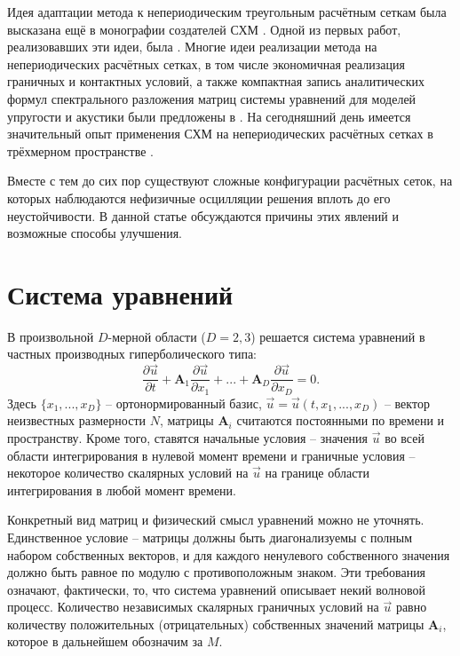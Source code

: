 \documentclass[a4paper]{article}
\numberwithin{equation}{section}
\begin{document}
Идея адаптации метода к непериодическим треугольным расчётным сеткам была 
высказана ещё в монографии создателей СХМ \cite{magomedov_kholodov_1988}. 
Одной из первых работ, реализовавших эти идеи, была \cite{chelnokov_agapov}. 
Многие идеи реализации метода на непериодических расчётных сетках, в том числе 
экономичная реализация граничных и контактных условий, а также 
компактная запись аналитических формул спектрального разложения 
матриц системы уравнений для моделей упругости и акустики были предложены в \cite{chelnokov}.
На сегодняшний день имеется значительный опыт применения СХМ 
на непериодических расчётных сетках в трёхмерном пространстве 
\cite{vassilevski_15, favorskaya_tetr}.

Вместе с тем до сих пор существуют сложные конфигурации расчётных сеток, на 
которых наблюдаются нефизичные осцилляции решения вплоть до его неустойчивости. 
В данной статье обсуждаются причины этих явлений и возможные способы улучшения. 


\section{Система уравнений}
В произвольной $D$-мерной области ($D = 2, 3$) решается система уравнений 
в частных производных гиперболического типа:
\begin{equation}
\label{general_equation}
	\frac{\partial\vec{u}}{\partial{t}}+
	\mathbf{A}_1\frac{\partial\vec{u}}{\partial{x_1}}+...+
	\mathbf{A}_D\frac{\partial\vec{u}}{\partial{x_D}}=0.
\end{equation}
Здесь $\{x_1, ..., x_D\}$ -- ортонормированный базис, 
$\vec{u} = \vec{u}(t, x_1, ..., x_D)$ -- вектор неизвестных размерности $N$,
матрицы $\mathbf{A}_i$ считаются постоянными по времени и пространству.
Кроме того, ставятся начальные условия -- значения $\vec{u}$ 
во всей области интегрирования в нулевой момент времени и
граничные условия -- некоторое количество скалярных условий на $\vec{u}$ 
на границе области интегрирования в любой момент времени.

Конкретный вид матриц и физический смысл уравнений можно не уточнять. 
Единственное условие -- матрицы должны быть диагонализуемы с полным набором 
собственных векторов, и для каждого ненулевого собственного значения должно быть
равное по модулю с противоположным знаком. Эти требования означают, фактически,
то, что система уравнений описывает некий волновой процесс. Количество
независимых скалярных граничных условий на $\vec{u}$ равно количеству
положительных (отрицательных) собственных значений матрицы $\mathbf{A}_i$, 
которое в дальнейшем обозначим за $M$.
\end{document}
